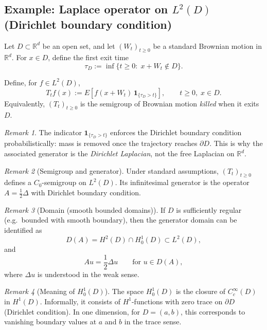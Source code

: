 \documentclass[11pt]{article}
\theoremstyle{definition}
\theoremstyle{remark}
\newtheorem{remark}{Remark}
\begin{document}
\subsection*{Example: Laplace operator on $L^2(D)$ (Dirichlet boundary condition)}

Let $D \subset \mathbb{R}^d$ be an open set, and let $(W_t)_{t\ge 0}$ be a standard Brownian motion in $\mathbb{R}^d$.
For $x\in D$, define the first exit time
\[
    \tau_D
    :=
    \inf\{t\ge 0:\; x+W_t \notin D\}.
\]

Define, for $f \in L^2(D)$,
\begin{equation}\label{eq:killed-semigroup}
    T_t f(x)
    :=
    E\!\left[f(x+W_t)\,\mathbf{1}_{\{\tau_D>t\}}\right],
    \qquad t\ge 0,\; x\in D.
\end{equation}
Equivalently, $(T_t)_{t\ge 0}$ is the semigroup of Brownian motion \emph{killed} when it exits $D$.

\begin{remark}
The indicator $\mathbf{1}_{\{\tau_D>t\}}$ enforces the Dirichlet boundary condition probabilistically:
mass is removed once the trajectory reaches $\partial D$.
This is why the associated generator is the \emph{Dirichlet Laplacian}, not the free Laplacian on $\mathbb{R}^d$.
\end{remark}

\begin{remark}[Semigroup and generator]
Under standard assumptions, $(T_t)_{t\ge 0}$ defines a $C_0$-semigroup on $L^2(D)$.
Its infinitesimal generator is the operator $A=\frac12\Delta$ with Dirichlet boundary condition.
\end{remark}

\begin{remark}[Domain (smooth bounded domains)]
If $D$ is sufficiently regular (e.g.\ bounded with smooth boundary), then the generator domain can be identified as
\[
    D(A)=H^2(D)\cap H_0^1(D)\subset L^2(D),
\]
and
\[
    Au=\frac12\Delta u
    \qquad \text{for } u\in D(A),
\]
where $\Delta u$ is understood in the weak sense.
\end{remark}

\begin{remark}[Meaning of $H_0^1(D)$]
The space $H_0^1(D)$ is the closure of $C_c^\infty(D)$ in $H^1(D)$.
Informally, it consists of $H^1$-functions with zero trace on $\partial D$ (Dirichlet condition).
In one dimension, for $D=(a,b)$, this corresponds to vanishing boundary values at $a$ and $b$ in the trace sense.
\end{remark}
\end{document}
